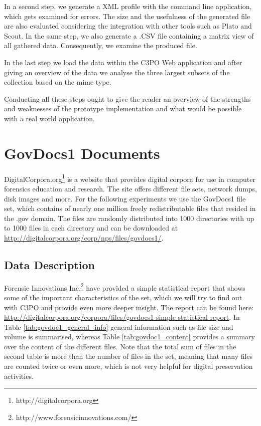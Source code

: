 In a second step, we generate a XML profile with the command line application, which gets examined for errors. The size and the usefulness of the generated file are also evaluated considering the integration with other tools such as Plato and Scout. In the same step, we also generate a .CSV file containing a matrix view of all gathered data. Consequently, we examine the produced file.

In the last step we load the data within the C3PO Web application and after giving an overview of the data we analyse the three largest subsets of the collection based on the mime type.

Conducting all these steps ought to give the reader an overview of the strengths and weaknesses of the prototype implementation and what would be possible with a real world application.

\section{GovDocs1 Documents}
DigitalCorpora.org\footnote{http://digitalcorpora.org} is a website that provides digital corpora for use in computer forensics education and research.
The site offers different file sets, network dumps, disk images and more.
For the following experiments we use the GovDocs1 file set, which contains of nearly one million freely redistributable files that resided in the .gov domain.
The files are randomly distributed into 1000 directories with up to 1000 files in each directory and can be downloaded at \url{http://digitalcorpora.org/corp/nps/files/govdocs1/}.

\subsection{Data Description}
Forensic Innovations Inc.\footnote{http://www.forensicinnovations.com/} have provided a simple statistical report that shows some of the important characteristics of the set, which we will try to find out with C3PO and provide even more deeper insight.
The report can be found here: \url{http://digitalcorpora.org/corpora/files/govdocs1-simple-statistical-report}.
In Table \ref{tab:govdoc1_general_info} general information such as file size and volume is summarised, whereas Table \ref{tab:govdoc1_content} provides a summary over the content of the different files.
Note that the total sum of files in the second table is more than the number of files in the set, meaning that many files are counted twice or even more, which is not very helpful for digital preservation activities.

